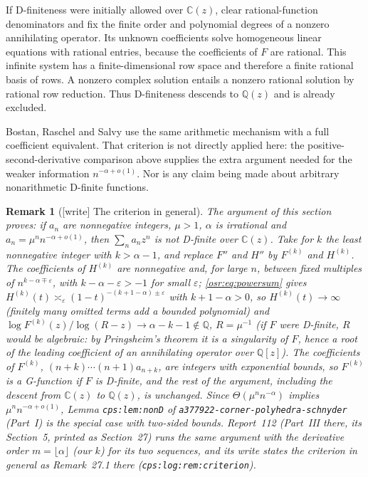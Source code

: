 \documentclass[11pt,letterpaper]{article}
\newtheorem{remark}[theorem]{Remark}
\newcommand{\Q}{\mathbb Q}\newcommand{\R}{\mathbb R}\newcommand{\Z}{\mathbb Z}
\numberwithin{equation}{section}
\begin{document}
If D-finiteness were initially allowed over $\mathbb C(z)$, clear rational-function denominators and fix the finite order and polynomial degrees of a nonzero annihilating operator. Its unknown coefficients solve homogeneous linear equations with rational entries, because the coefficients of $F$ are rational. This infinite system has a finite-dimensional row space and therefore a finite rational basis of rows. A nonzero complex solution entails a nonzero rational solution by rational row reduction. Thus D-finiteness descends to $\Q(z)$ and is already excluded.

Bostan, Raschel and Salvy \cite[Theorem 3]{BRS} use the same arithmetic mechanism with a full coefficient equivalent. That criterion is not directly applied here: the positive-second-derivative comparison above supplies the extra argument needed for the weaker information $n^{-\alpha+o(1)}$. Nor is any claim being made about arbitrary nonarithmetic D-finite functions.

\begin{remark}[{[write]} The criterion in general]\label{osr:rem:criterion}\upshape
The argument of this section proves: \emph{if $a_n$ are nonnegative
integers, $\mu>1$, $\alpha$ is irrational and $a_n=\mu^nn^{-\alpha+o(1)}$,
then $\sum_na_nz^n$ is not D-finite over $\mathbb C(z)$.} Take for $k$ the
least nonnegative integer with $k>\alpha-1$, and replace $F''$ and $H''$ by
$F^{(k)}$ and $H^{(k)}$. The coefficients of $H^{(k)}$ are nonnegative and,
for large $n$, between fixed multiples of $n^{k-\alpha\mp\varepsilon}$, with
$k-\alpha-\varepsilon>-1$ for small $\varepsilon$;
\eqref{osr:eq:powersum} gives
$H^{(k)}(t)\asymp_\varepsilon(1-t)^{-(k+1-\alpha)\pm\varepsilon}$ with
$k+1-\alpha>0$, so $H^{(k)}(t)\to\infty$ (finitely many omitted terms add a
bounded polynomial) and
$\log F^{(k)}(z)/\log(R-z)\to\alpha-k-1\notin\Q$, $R=\mu^{-1}$ (if $F$
were D-finite, $R$ would be algebraic: by Pringsheim's theorem it is a
singularity of $F$, hence a root of the leading coefficient of an
annihilating operator over $\Q[z]$). The
coefficients of $F^{(k)}$, $(n+k)\cdots(n+1)a_{n+k}$, are integers with
exponential bounds, so $F^{(k)}$ is a G-function if $F$ is D-finite, and the
rest of the argument, including the descent from $\mathbb C(z)$ to $\Q(z)$,
is unchanged. Since $\Theta(\mu^nn^{-\alpha})$ implies
$\mu^nn^{-\alpha+o(1)}$, Lemma \nolinkurl{cps:lem:nonD} of
\nolinkurl{a377922-corner-polyhedra-schnyder} (Part~I) is the special case
with two-sided bounds. Report~112 (Part~III there, its Section~5, printed
as Section~27) runs the same argument with the derivative order
$m=\lfloor\alpha\rfloor$ (our $k$) for its two sequences, and its write
states the criterion in general as Remark~27.1 there
(\nolinkurl{cps:log:rem:criterion}).
\end{remark}
\end{document}
